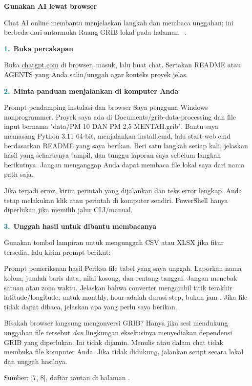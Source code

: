 \documentclass[11pt,a4paper]{article}
\newcommand{\step}[2]{\par\addvspace{2mm}\noindent\textcolor{teal}{\textbf{#1.}}\ \textbf{#2}\par\nobreak}
\newcommand{\pagetitle}[3]{\clearpage{\color{teal}\small\bfseries LANGKAH #1}\par{\color{slate}\LARGE\bfseries #2}\par\vspace{2mm}#3\par\vspace{3mm}}
\newcommand{\source}[1]{{\footnotesize\color{blue}Sumber: [#1], daftar tautan di halaman \pageref{pg:references}.}\par}
\begin{document}
\pagetitle{13}{Gunakan AI lewat browser}{Chat AI online membantu menjelaskan langkah dan membaca unggahan; ini berbeda dari antarmuka Ruang GRIB lokal pada halaman \pageref{pg:web-start}--\pageref{pg:web-results}.}
\label{pg:ai-browser}
\step{1}{Buka percakapan}
Buka \href{https://chatgpt.com}{chatgpt.com} di browser, masuk, lalu buat chat.
Sertakan README atau AGENTS yang Anda salin/unggah agar konteks proyek jelas.
\step{2}{Minta panduan menjalankan di komputer Anda}
\begin{panel}{Prompt pendamping instalasi dan browser}
Saya pengguna Windows nonprogrammer. Proyek saya ada di
Documents/grib-data-processing dan file input bernama
"data/PM 10 DAN PM 2,5 MENTAH.grib". Bantu saya memasang Python 3.11 64-bit,
menjalankan install.cmd, lalu start-web.cmd berdasarkan README yang saya berikan.
Beri satu langkah setiap kali, jelaskan hasil yang seharusnya tampil,
dan tunggu laporan saya sebelum langkah berikutnya. Jangan menganggap
Anda dapat membaca file lokal saya dari nama path saja.
\end{panel}
Jika terjadi error, kirim perintah yang dijalankan dan teks error lengkap.
Anda tetap melakukan klik atau perintah di komputer sendiri. PowerShell
hanya diperlukan jika memilih jalur CLI/manual.
\step{3}{Unggah hasil untuk dibantu membacanya}
Gunakan tombol lampiran untuk mengunggah CSV atau XLSX jika fitur tersedia,
lalu kirim prompt berikut:
\begin{panel}{Prompt pemeriksaan hasil}
Periksa file tabel yang saya unggah. Laporkan nama kolom, jumlah baris data,
nilai kosong, dan rentang tanggal. Jangan menebak satuan atau zona waktu.
Jelaskan bahwa converter mengambil titik terakhir latitude/longitude;
untuk monthly, hour adalah durasi step, bukan jam .
Jika file tidak dapat dibaca, jelaskan apa yang perlu saya berikan.
\end{panel}
\begin{panel}{Bisakah browser langsung mengonversi GRIB?}
Hanya jika sesi mendukung unggahan file tersebut \emph{dan} lingkungan
eksekusinya menyediakan dependensi GRIB yang diperlukan. Ini tidak dijamin.
Menulis  atau  dalam chat tidak membuka file komputer
Anda. Jika tidak didukung, jalankan script secara lokal dan unggah hasilnya.
\end{panel}
\source{7, 8}
\end{document}
